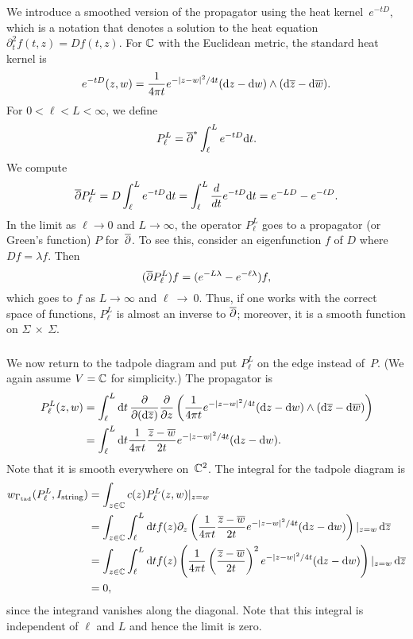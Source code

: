 We introduce a smoothed version of the propagator using the heat kernel~$e^{-tD}$,
which is a notation that denotes a solution to the heat equation $\partial_t^2 f(t,z) = Df(t,z)$.
For $\mathbb C$ with the Euclidean metric, the standard heat kernel is
\[
e^{-tD}(z,w) =  \frac{1}{4\pi t} e^{-|z-w|^2/4t} ({\rm d} z - {\rm d} w) \wedge ({\rm d}\overline{z} - {\rm d}\overline{w}) . 
\]
For $0 < \ell < L < \infty$, we define
\[
P_\ell^L = \overline{\partial}^* \int_{\ell}^L e^{-tD}{\rm d} t.
\]
We compute
\[
\overline{\partial} P_\ell^L = D \int_{\ell}^L e^{-tD}{\rm d} t =  \int_{\ell}^L \frac{d}{dt} e^{-tD}{\rm d} t = e^{-LD} - e^{-\ell D}.
\]
In the limit as $\ell \to 0$ and $L \to \infty$, the operator $P_\ell^L$ goes to a propagator (or Green's function) $P$ for~$\overline{\partial}$.
To see this, consider an eigenfunction $f$ of $D$ where $Df=\lambda f$.
Then
\[
(\overline{\partial} P_\ell^L) f = (e^{-L\lambda} - e^{-\ell \lambda})f, 
\]
which goes to $f$ as $L \to \infty$ and $\ell~\to~0$.
Thus, if one works with the correct space of functions, 
$P_\ell^L$ is almost an inverse to $\overline{\partial}$;
moreover, it is a smooth function on $\Sigma~\times~\Sigma$.

\subsubsection{}

We now return to the tadpole diagram and put $P_\ell^L$ on the edge instead of~$P$.
(We again assume $V = \mathbb C$ for simplicity.)
The propagator is
\begin{align}\label{propagator}
P_\ell^L(z,w) &= \int_{\ell}^L {\rm d} t \, \frac{\partial}{\partial ({\rm d} \overline{z})} \frac{\partial}{\partial z}\left( \frac{1}{4\pi t} e^{-|z-w|^2/4t} ({\rm d} z - {\rm d} w) \wedge ({\rm d}\overline{z} - {\rm d}\overline{w})\right)\\
&= \int_{\ell}^L {\rm d} t \frac{1}{4\pi t} \frac{\overline{z} - \overline{w}}{2t} e^{-|z-w|^2/4t} ({\rm d} z - {\rm d} w).
\end{align}
Note that it is smooth everywhere on~$\mathbb C^2$.
The integral for the tadpole diagram is 
\begin{align*}
w_{\Gamma_{\rm tad}}(P_\ell^L,I_{\rm string})
&= \int_{z \in \mathbb C} c(z)P_\ell^L(z,w)|_{z = w}  \\
&= \int_{z \in \mathbb C} \int_{\ell}^L {\rm d} t f(z) \partial_z \left(\frac{1}{4\pi t} \frac{\overline{z} - \overline{w}}{2t} e^{-|z-w|^2/4t} ({\rm d} z - {\rm d} w) \right)|_{z = w}\, {\rm d} \overline{z}\\
&= \int_{z \in \mathbb C} \int_{\ell}^L {\rm d} t f(z) \left(\frac{1}{4\pi t} \left(\frac{\overline{z} - \overline{w}}{2t}\right)^2 e^{-|z-w|^2/4t} ({\rm d} z - {\rm d} w) \right)|_{z = w}\, {\rm d} \overline{z}\\
&= 0,
\end{align*}
since the integrand vanishes along the diagonal.
Note that this integral is independent of $\ell$ and $L$ and hence the limit is zero.

